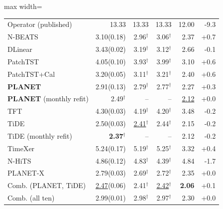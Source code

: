 \begin{table}[!t]
\begin{adjustbox}{max width=\linewidth}
\begin{tabular}{lrrrrr}
\quad Operator (published) & 13.33 & 13.33 & 13.33 & 12.00 & -9.3 \\
\quad N-BEATS & 3.10{\scriptsize\color{gray}(0.18)} & 2.96$^{\dagger}$ & 3.06$^{\dagger}$ & 2.37 & +0.7 \\
\quad DLinear & 3.43{\scriptsize\color{gray}(0.02)} & 3.19$^{\dagger}$ & 3.12$^{\dagger}$ & 2.66 & -0.1 \\
\quad PatchTST & 4.05{\scriptsize\color{gray}(0.10)} & 3.93$^{\dagger}$ & 3.99$^{\dagger}$ & 3.10 & +0.6 \\
\quad PatchTST+Cal & 3.20{\scriptsize\color{gray}(0.05)} & 3.11$^{\dagger}$ & 3.21$^{\dagger}$ & 2.40 & +0.6 \\
\quad \textbf{PLANET} & 2.91{\scriptsize\color{gray}(0.13)} & 2.79$^{\dagger}$ & 2.77$^{\dagger}$ & 2.27 & +0.3 \\
\quad \textbf{PLANET} (monthly refit) & 2.49$^{\dagger}$ & -- & -- & \underline{2.12} & +0.0 \\
\quad TFT & 4.30{\scriptsize\color{gray}(0.03)} & 4.19$^{\dagger}$ & 4.20$^{\dagger}$ & 3.48 & -0.2 \\
\quad TiDE & 2.50{\scriptsize\color{gray}(0.03)} & \underline{2.41}$^{\dagger}$ & 2.44$^{\dagger}$ & 2.15 & -0.2 \\
\quad TiDE (monthly refit) & \textbf{2.37}$^{\dagger}$ & -- & -- & 2.12 & -0.2 \\
\quad TimeXer & 5.24{\scriptsize\color{gray}(0.17)} & 5.19$^{\dagger}$ & 5.25$^{\dagger}$ & 3.32 & +0.4 \\
\quad N-HiTS & 4.86{\scriptsize\color{gray}(0.12)} & 4.83$^{\dagger}$ & 4.39$^{\dagger}$ & 4.84 & -1.7 \\
\quad PLANET-X & 2.79{\scriptsize\color{gray}(0.03)} & 2.69$^{\dagger}$ & 2.72$^{\dagger}$ & 2.35 & +0.0 \\
\quad Comb. (PLANET, TiDE) & \underline{2.47}{\scriptsize\color{gray}(0.06)} & 2.41$^{\dagger}$ & \underline{2.42}$^{\dagger}$ & \textbf{2.06} & +0.1 \\
\quad Comb. (all ten) & 2.99{\scriptsize\color{gray}(0.01)} & 2.98$^{\dagger}$ & 2.97$^{\dagger}$ & 2.30 & +0.0 \\
\bottomrule
\end{tabular}
\end{adjustbox}
\end{table}
